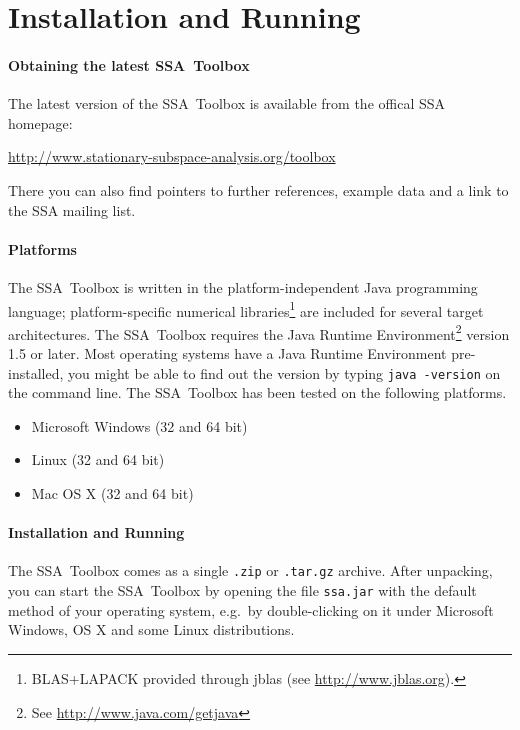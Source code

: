 \documentclass{article}
\newcommand{\1}{\ensuremath{\mathds{1}}}
\newcommand{\0}{\ensuremath{0}}
\begin{document}
\section{Installation and Running}
\label{sec:install_run}

\paragraph{Obtaining the latest SSA~Toolbox}

The latest version of the SSA~Toolbox is available from the offical SSA homepage: 
\begin{center}
	\url{http://www.stationary-subspace-analysis.org/toolbox}
\end{center}
There you can also find pointers to further references, example data and a link 
to the SSA mailing list. 

\paragraph{Platforms}

The SSA~Toolbox is written in the platform-independent Java programming language; 
platform-specific numerical libraries\footnote{BLAS+LAPACK provided through
jblas (see \url{http://www.jblas.org}).} are included for several target architectures. 
The SSA~Toolbox requires the Java Runtime Environment\footnote{See 
\url{http://www.java.com/getjava}} version 1.5 or later. Most operating systems
have a Java Runtime Environment pre-installed, you might be able to find out 
the version by typing \texttt{java -version} on the command line. The SSA~Toolbox has 
been tested on the following platforms.
\begin{itemize}
	\item Microsoft Windows (32 and 64 bit)
	\item Linux (32 and 64 bit)
	\item Mac OS X (32 and 64 bit)
\end{itemize}

\paragraph{Installation and Running}

The SSA~Toolbox comes as a single \texttt{.zip} or \texttt{.tar.gz} archive. 
After unpacking, you can start the SSA~Toolbox by opening the file \texttt{ssa.jar}
with the default method of your operating system, e.g.~by double-clicking on it under 
Microsoft Windows, OS X and some Linux distributions.
\end{document}

